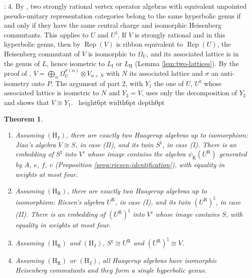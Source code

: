 \documentclass[leqno]{article}
\newcommand{\qed}{\hfill \vrule height6pt  width6pt depth0pt}
\newcommand{\ot}{\otimes}
\DeclareMathOperator{\Rep}{Rep}
\newtheorem{thm}{Theorem}[section]
\newenvironment{proof}[1][]{\noindent {\it Proof #1} : }{\hbox{~}\qed
\smallskip
}
\numberwithin{equation}{section}
\begin{document}
\begin{proof}
4. By \cite[Corollary 4.10]{MoR24a}, two strongly rational vertex operator algebras with equivalent unpointed pseudo-unitary representation categories belong to the same hyperbolic genus if and only if they have the same central charge and isomorphic Heisenberg commutants. This applies to $U$ and $U^\natural$. If $V$ is strongly rational and in this hyperbolic genus, then by \cite[Theorems 4.7 and 4.8]{MoR24a} $\Rep(V)$ is ribbon equivalent to $\Rep(U)$, the Heisenberg commutant of $V$ is isomorphic to $\Omega_U$, and its associated lattice is in the genus of $L$, hence isometric to $L_{\mathrm I}$ or $L_{\mathrm{II}}$ (Lemma \ref{lem:two-lattices}). By the proof of \cite[Corollary 4.10]{MoR24a}, $V = \bigoplus_\alpha \Omega_U^{\sigma(\alpha)} \ot V_{\alpha+N}$ with $N$ its associated lattice and $\sigma$ an anti-isometry onto $P$. The argument of part 2, with $Y_1$ the one of $U$, $U^\natural$ whose associated lattice is isometric to $N$ and $Y_2 = V$, uses only the decomposition of $Y_2$ and shows that $V \cong Y_1$.
\end{proof}

\begin{thm}
\label{thm:classification-one}
\begin{enumerate}
\item Assuming $\mathrm{(H_J)}$, there are exactly two Haagerup algebras up to isomorphism: Jiao's algebra $V \cong S$, in case (II), and its twin $S^\natural$, in case (I). There is an embedding of $S^\natural$ into $V'$ whose image contains the algebra $\psi_{\mathrm R}(U^{\mathrm R})$ generated by $A$, $e$, $f$, $v$ (Proposition \ref{prop:riesen-identification}), with equality in weights at most four.
\item Assuming $\mathrm{(H_R)}$, there are exactly two Haagerup algebras up to isomorphism: Riesen's algebra $U^{\mathrm R}$, in case (I), and its twin $(U^{\mathrm R})^\natural$, in case (II). There is an embedding of $(U^{\mathrm R})^\natural$ into $V'$ whose image contains $S$, with equality in weights at most four.
\item Assuming $\mathrm{(H_R)}$ and $\mathrm{(H_J)}$, $S^\natural \cong U^{\mathrm R}$ and $(U^{\mathrm R})^\natural \cong V$.
\item Assuming $\mathrm{(H_R)}$ or $\mathrm{(H_J)}$, all Haagerup algebras have isomorphic Heisenberg commutants and they form a single hyperbolic genus.
\end{enumerate}
\end{thm}
\end{document}
